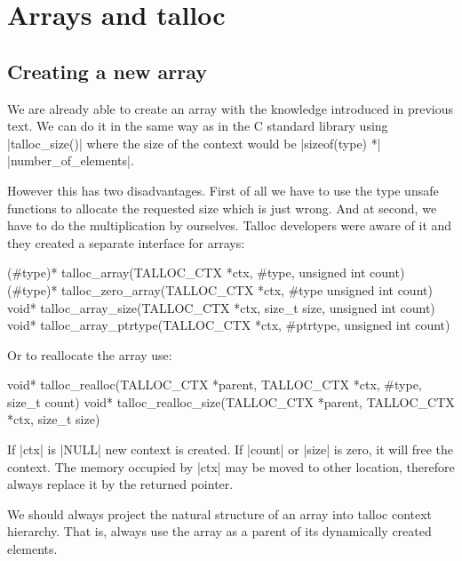 \section{Arrays and talloc}
\label{talloc:sec:arrays}

\subsection{Creating a new array}

We are already able to create an array with the knowledge introduced in
previous text. We can do it in the same way as in the C standard library using
|talloc_size()| where the size of the context would be |sizeof(type) *|
|number_of_elements|.

However this has two disadvantages. First of all we have to use the type unsafe
functions to allocate the requested size which is just wrong. And at second,
we have to do the multiplication by ourselves. Talloc developers were aware of
it and they created a separate interface for arrays:

\begin{funcproto}
(#type)* talloc_array(TALLOC_CTX *ctx, #type,
                      unsigned int count)
(#type)* talloc_zero_array(TALLOC_CTX *ctx, #type
                           unsigned int count)
void* talloc_array_size(TALLOC_CTX *ctx, size_t size,
                        unsigned int count)
void* talloc_array_ptrtype(TALLOC_CTX *ctx, #ptrtype,
                           unsigned int count)
\end{funcproto}
\funclistend
Or to reallocate the array use:

\begin{funcproto}
void* talloc_realloc(TALLOC_CTX *parent,
                     TALLOC_CTX *ctx,
                     #type, size_t count)
void* talloc_realloc_size(TALLOC_CTX *parent,
                          TALLOC_CTX *ctx,
                          size_t size)
\end{funcproto}
\begin{funcdesc}
If |ctx| is |NULL| new context is created. If |count| or |size| is zero, it will
free the context. The memory occupied by |ctx| may be moved to other location,
therefore always replace it by the returned pointer.
\end{funcdesc}
\funclistend
We should always project the natural structure of an array into talloc context
hierarchy. That is, always use the array as a parent of its dynamically created
elements.

